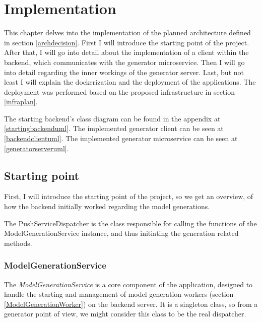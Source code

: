 \chapter{Implementation} \label{Implementation}

	This chapter delves into the implementation of the planned architecture defined in section \ref{archdecision}.
	First I will introduce the starting point of the project.
	After that, I will go into detail about the implementation of a client within the backend, which communicates with 
	the generator microservice. Then I will go into detail
	regarding the inner workings of the generator server. 
	Last, but not least I will explain the dockerization and the deployment of the applications. The deployment
	was performed based on the proposed infrastructure in section \ref{infraplan}.

	The starting backend's class diagram can be found in the appendix at \ref{startingbackenduml}.
	The implemented generator client can be seen at \ref{backendclientuml}.
	The implemented generator microservice can be seen at \ref{generatorserveruml}.

	\section{Starting point} \label{Starting point}
		First, I will introduce the starting point of the project, so we get an overview, of how the backend initially worked regarding the model
		generations.

		The PushServiceDispatcher is the class responsible for calling the functions of the ModelGenerationService instance, and thus initiating
		the generation related methods.

		\subsection{ModelGenerationService} \label{ModelGenerationService}
			The \textit{ModelGenerationService} is a core component of the application, designed to handle the starting and management of
			model generation workers (section \ref{ModelGenerationWorker}) on the backend server. 
			It is a singleton class, so from a generator point of view, we might consider this class to be the real dispatcher.

